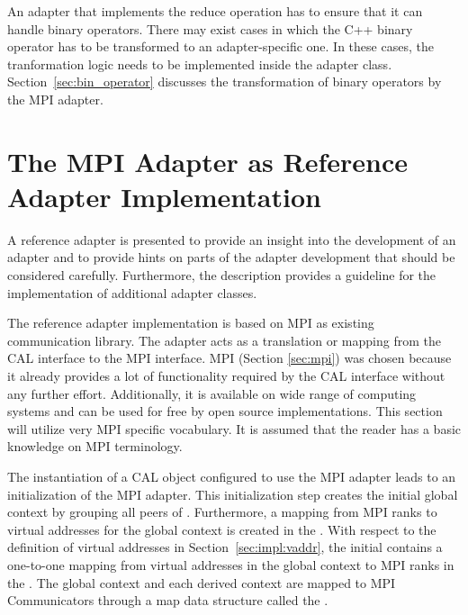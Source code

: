\noindent An adapter that implements the reduce operation has to
ensure that it can handle binary operators.  There may exist cases in
which the C++ binary operator has to be transformed to an
adapter-specific one.  In these cases, the tranformation logic needs
to be implemented inside the adapter class.
Section~\ref{sec:bin_operator} discusses the transformation of binary
operators by the MPI adapter.

\section{The MPI Adapter as Reference Adapter Implementation}
\label{sec:cal_mpi_adapter}

A reference adapter is presented to provide an insight into the
development of an adapter and to provide hints on parts of the adapter
development that should be considered carefully. Furthermore, the
description provides a guideline for the implementation of additional
adapter classes.

The reference adapter implementation is based on MPI as existing
communication library. The adapter acts as a translation or mapping
from the CAL interface to the MPI interface.  MPI (Section
\ref{sec:mpi}) was chosen because it already provides a lot of
functionality required by the CAL interface without any further
effort. Additionally, it is available on wide range of computing
systems and can be used for free by open source implementations. This
section will utilize very MPI specific vocabulary. It is assumed
that the reader has a basic knowledge on MPI terminology.

The instantiation of a CAL object configured to use the MPI adapter
leads to an initialization of the MPI adapter. This initialization
step creates the initial global context by grouping all peers of
.  Furthermore, a mapping from MPI ranks to
virtual addresses for the global context is created in the
.  With respect to the definition of virtual addresses
in Section~\ref{sec:impl:vaddr}, the initial  contains a
one-to-one mapping from virtual addresses in the global context to MPI
ranks in the .  The global context and each
derived context are mapped to MPI Communicators through a map data
structure called the .

